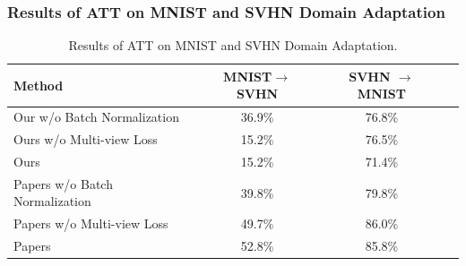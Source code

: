 \documentclass{beamer}
\begin{document}
\begin{frame}
    \frametitle{Results of ATT on MNIST and SVHN Domain Adaptation}

    \begin{table}[h]
        \centering
        \caption{Results of ATT on MNIST and SVHN Domain Adaptation.}
        \label{tab:att_results}
        \begin{tabular}{lccc}
            \toprule
            \textbf{Method} & \textbf{MNIST\(\to\)SVHN} & \textbf{SVHN \(\to\) MNIST} \\
            \midrule
            Our w/o Batch Normalization & 36.9\% & 76.8\% \\
            Ours w/o Multi-view Loss & 15.2\% & 76.5\% \\
            Ours  & 15.2\% & 71.4\% \\
            \midrule
            Papers w/o Batch Normalization & 39.8\% & 79.8\% \\
            Papers w/o Multi-view Loss & 49.7\% & 86.0\% \\
            Papers  & 52.8\% & 85.8\% \\
            \bottomrule
        \end{tabular}
      \end{table}
\end{frame}
\end{document}
